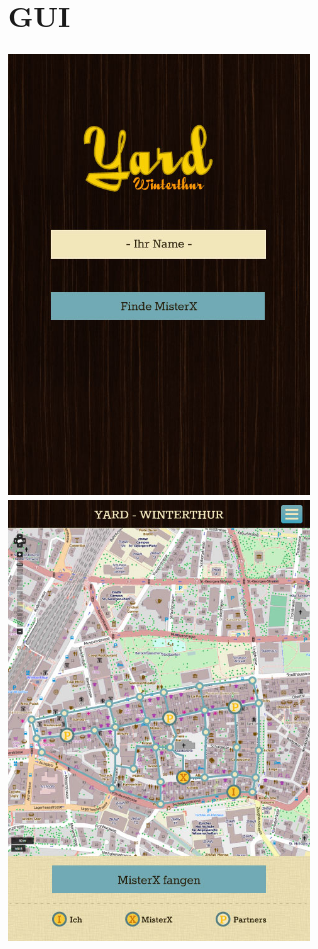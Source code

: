 \documentclass[11pt]{article}
\begin{document}
\section{GUI}
\includegraphics[width=8cm]{Bilder/homeView.jpg}
\includegraphics[width=8cm]{Bilder/karteView.jpg}
\end{document}
